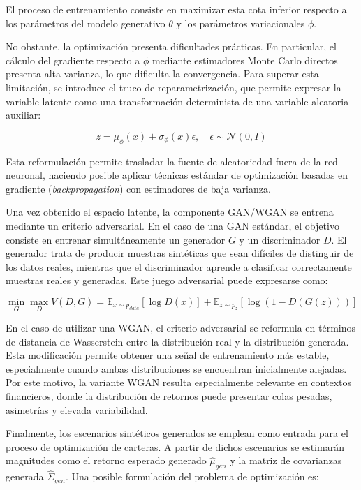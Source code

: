 El proceso de entrenamiento consiste en maximizar esta cota inferior respecto a los parámetros del modelo generativo $\theta$ y los parámetros variacionales $\phi$.

No obstante, la optimización presenta dificultades prácticas. En particular, el cálculo del gradiente respecto a $\phi$ mediante estimadores Monte Carlo directos presenta alta varianza, lo que dificulta la convergencia. Para superar esta limitación, se introduce el truco de reparametrización, que permite expresar la variable latente como una transformación determinista de una variable aleatoria auxiliar:

\begin{equation}
z
=
\mu_{\phi}(x)
+
\sigma_{\phi}(x)\epsilon,
\quad
\epsilon \sim \mathcal{N}(0,I)
\end{equation}

Esta reformulación permite trasladar la fuente de aleatoriedad fuera de la red neuronal, haciendo posible aplicar técnicas estándar de optimización basadas en gradiente (\textit{backpropagation}) con estimadores de baja varianza.

Una vez obtenido el espacio latente, la componente GAN/WGAN se entrena mediante un criterio adversarial. En el caso de una GAN estándar, el objetivo consiste en entrenar simultáneamente un generador $G$ y un discriminador $D$. El generador trata de producir muestras sintéticas que sean difíciles de distinguir de los datos reales, mientras que el discriminador aprende a clasificar correctamente muestras reales y generadas. Este juego adversarial puede expresarse como:

\begin{equation}
\min_{G}\max_{D} V(D,G)
=
\mathbb{E}_{x \sim p_{data}}
\left[
\log D(x)
\right]
+
\mathbb{E}_{z \sim p_z}
\left[
\log \left(1-D(G(z))\right)
\right]
\end{equation}

En el caso de utilizar una WGAN, el criterio adversarial se reformula en términos de distancia de Wasserstein entre la distribución real y la distribución generada. Esta modificación permite obtener una señal de entrenamiento más estable, especialmente cuando ambas distribuciones se encuentran inicialmente alejadas. Por este motivo, la variante WGAN resulta especialmente relevante en contextos financieros, donde la distribución de retornos puede presentar colas pesadas, asimetrías y elevada variabilidad.

Finalmente, los escenarios sintéticos generados se emplean como entrada para el proceso de optimización de carteras. A partir de dichos escenarios se estimarán magnitudes como el retorno esperado generado $\hat{\mu}_{gen}$ y la matriz de covarianzas generada $\hat{\Sigma}_{gen}$. Una posible formulación del problema de optimización es:

